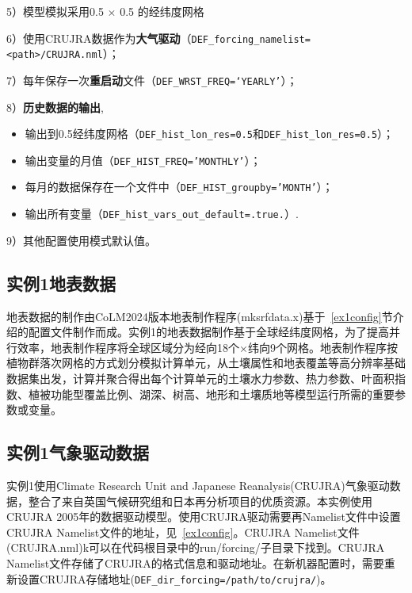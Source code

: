 5）模型模拟采用0.5 \textdegree $\times$ 0.5 \textdegree 的经纬度网格\par

6）使用CRUJRA数据作为\textbf{大气驱动}（\texttt{DEF\_forcing\_namelist=<path>/CRUJRA.nml}）；\par
7）每年保存一次\textbf{重启动}文件（\texttt{DEF\_WRST\_FREQ=‘YEARLY’}）；\par
8）\textbf{历史数据的输出},
\begin{itemize}[nosep,leftmargin=4em]
    \item 输出到0.5\textdegree 经纬度网格（\texttt{DEF\_hist\_lon\_res=0.5}和\texttt{DEF\_hist\_lon\_res=0.5}）；
    \item 输出变量的月值（\texttt{DEF\_HIST\_FREQ='MONTHLY'}）；
    \item 每月的数据保存在一个文件中（\texttt{DEF\_HIST\_groupby='MONTH'}）；
    \item 输出所有变量（\texttt{DEF\_hist\_vars\_out\_default=.true.}）.
\end{itemize}\par
9）其他配置使用模式默认值。

\subsection{实例1地表数据}

地表数据的制作由CoLM2024版本地表制作程序(mksrfdata.x)基于~\ref{ex1config}节介绍的配置文件制作而成。实例1的地表数据制作基于全球经纬度网格，为了提高并行效率，地表制作程序将全球区域分为经向18个$\times$纬向9个网格。地表制作程序按植物群落次网格的方式划分模拟计算单元，从土壤属性和地表覆盖等高分辨率基础数据集出发，计算并聚合得出每个计算单元的土壤水力参数、热力参数、叶面积指数、植被功能型覆盖比例、湖深、树高、地形和土壤质地等模型运行所需的重要参数或变量。

\subsection{实例1气象驱动数据}\label{ex1forcing}

实例1使用Climate Research Unit and Japanese Reanalysis(CRUJRA)气象驱动数据，整合了来自英国气候研究组和日本再分析项目的优质资源。本实例使用CRUJRA 2005年的数据驱动模型。使用CRUJRA驱动需要再Namelist文件中设置CRUJRA Namelist文件的地址，见~\ref{ex1config}。CRUJRA Namelist文件(CRUJRA.nml)k可以在代码根目录中的run/forcing/子目录下找到。CRUJRA Namelist文件存储了CRUJRA的格式信息和驱动地址。在新机器配置时，需要重新设置CRUJRA存储地址(\texttt{DEF\_dir\_forcing=/path/to/crujra/})。

